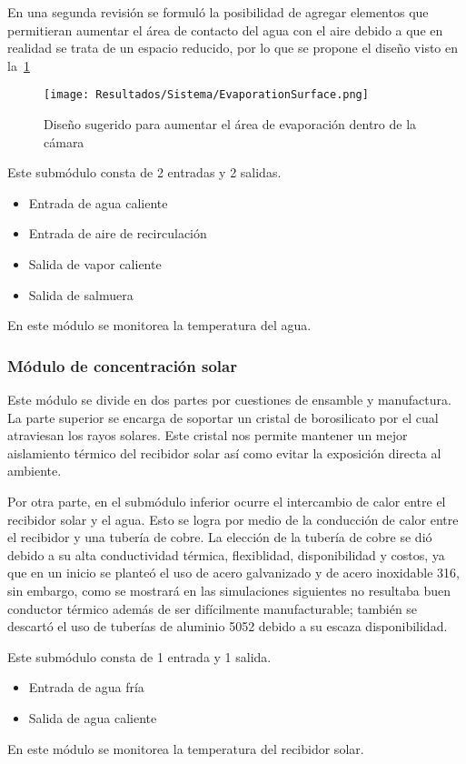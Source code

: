 				En una segunda revisión se formuló la posibilidad de agregar elementos que permitieran aumentar el área de contacto del agua con el aire debido a que en realidad se trata de un espacio reducido, por lo que se propone el diseño visto en la~\cref{fig:EvaporationSurface}
				
				\begin{figure}[H]
					\centering
					\texttt{[image: Resultados/Sistema/EvaporationSurface.png]}
					\caption{Diseño sugerido para aumentar el área de evaporación dentro de la cámara}
					\label{fig:EvaporationSurface}
				\end{figure}
				
				Este submódulo consta de 2 entradas y 2 salidas.
				
				\begin{itemize}[columns=2]
					\item Entrada de agua caliente
					\item Entrada de aire de recirculación
					\item Salida de vapor caliente
					\item Salida de salmuera
				\end{itemize}
				
				\begin{center}
					En este módulo se monitorea la temperatura del agua.
				\end{center}
			
			\subsubsection{Módulo de concentración solar}
				
				Este módulo se divide en dos partes por cuestiones de ensamble y manufactura. La parte superior se encarga de soportar un cristal de borosilicato por el cual atraviesan los rayos solares. Este cristal nos permite mantener un mejor aislamiento térmico del recibidor solar así como evitar la exposición directa al ambiente.
				
				Por otra parte, en el submódulo inferior ocurre el intercambio de calor entre el recibidor solar y el agua. Esto se logra por medio de la conducción de calor entre el recibidor y una tubería de cobre. La elección de la tubería de cobre se dió debido a su alta conductividad térmica, flexiblidad, disponibilidad y costos, ya que en un inicio se planteó el uso de acero galvanizado y de acero inoxidable 316, sin embargo, como se mostrará en las simulaciones siguientes no resultaba buen conductor térmico además de ser difícilmente manufacturable; también se descartó el uso de tuberías de aluminio 5052 debido a su escaza disponibilidad.
				
				
				Este submódulo consta de 1 entrada y 1 salida.
				
				\begin{itemize}[columns=2]
					\item Entrada de agua fría
					\item Salida de agua caliente
				\end{itemize}
				
				\begin{center}
					En este módulo se monitorea la temperatura del recibidor solar.
				\end{center}
				